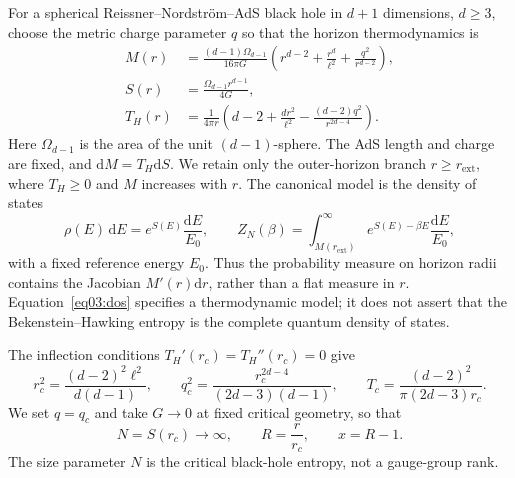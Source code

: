 \documentclass[11pt,letterpaper]{article}
\newcommand{\dd}{\mathrm{d}}
\theoremstyle{plain}
\theoremstyle{definition}
\theoremstyle{remark}
\begin{document}
For a spherical Reissner--Nordstr\"om--AdS black hole in $d+1$
dimensions, $d\geq3$, choose the metric charge parameter $q$ so that
the horizon thermodynamics is
\begin{align}
 M(r)&=\frac{(d-1)\Omega_{d-1}}{16\pi G}
 \left(r^{d-2}+\frac{r^d}{\ell^2}
                  +\frac{q^2}{r^{d-2}}\right),
 \label{eq03:mass_entropy}\\
 S(r)&=\frac{\Omega_{d-1}r^{d-1}}{4G},
 \nonumber\\
 T_H(r)&=\frac{1}{4\pi r}
 \left(d-2+\frac{d r^2}{\ell^2}
              -\frac{(d-2)q^2}{r^{2d-4}}\right).
 \label{eq03:temperature}
\end{align}
Here $\Omega_{d-1}$ is the area of the unit $(d-1)$-sphere.  The AdS
length and charge are fixed, and $\dd M=T_H\dd S$.  We retain only the
outer-horizon branch $r\geq r_{\mathrm{ext}}$, where $T_H\geq0$ and
$M$ increases with $r$.  The canonical model is the density of states
\begin{equation}
 \rho(E)\,\dd E=e^{S(E)}\frac{\dd E}{E_0},\qquad
 Z_N(\beta)=\int_{M(r_{\mathrm{ext}})}^\infty
       e^{S(E)-\beta E}\frac{\dd E}{E_0},
 \label{eq03:dos}
\end{equation}
with a fixed reference energy $E_0$.  Thus the probability measure on
horizon radii contains the Jacobian $M'(r)\dd r$, rather than a flat
measure in $r$.  Equation~\eqref{eq03:dos} specifies a thermodynamic
model; it does not assert that the Bekenstein--Hawking entropy is the
complete quantum density of states.

The inflection conditions $T_H'(r_c)=T_H''(r_c)=0$ give
\begin{equation}
 r_c^2=\frac{(d-2)^2\ell^2}{d(d-1)},\qquad
 q_c^2=\frac{r_c^{2d-4}}{(2d-3)(d-1)},\qquad
 T_c=\frac{(d-2)^2}{\pi(2d-3)r_c}.
 \label{eq03:critical_geometry}
\end{equation}
We set $q=q_c$ and take $G\to0$ at fixed critical geometry, so that
\begin{equation}
 N=S(r_c)\longrightarrow\infty,\qquad
 R=\frac{r}{r_c},\qquad x=R-1.
 \label{eq03:size}
\end{equation}
The size parameter $N$ is the critical black-hole entropy, not a
gauge-group rank.
\end{document}

